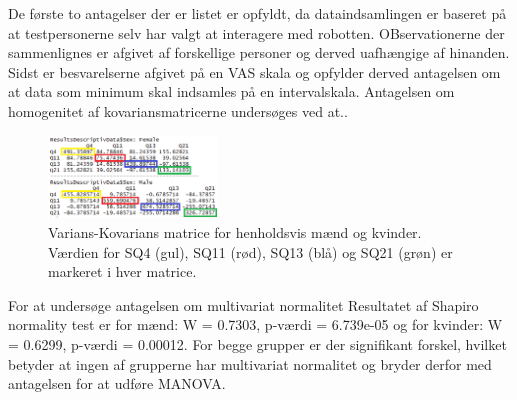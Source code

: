 De første to antagelser der er listet er opfyldt, da dataindsamlingen er baseret på at testpersonerne selv har valgt at interagere med robotten. OBservationerne der sammenlignes er afgivet af forskellige personer og derved uafhængige af hinanden. Sidst er besvarelserne afgivet på en VAS skala og opfylder derved antagelsen om at data som minimum skal indsamles på en intervalskala. \blankline
% 
Antagelsen om homogenitet af kovariansmatricerne undersøges ved at..
%
\begin{figure}[H]
\centering
\includegraphics[width = 0.4\textwidth]{Figure/DatabehandlingSkalaer/Normality} 
\caption{Varians-Kovarians matrice for henholdsvis mænd og kvinder. Værdien for SQ4 (gul), SQ11 (rød), SQ13 (blå) og SQ21 (grøn) er markeret i hver matrice.}
\label{fig:Normality}
\end{figure}
\noindent
%
For at undersøge antagelsen om multivariat normalitet \blankline
%
Resultatet af Shapiro normality test er for mænd: W = 0.7303, p-værdi = 6.739e-05 og for kvinder: W = 0.6299, p-værdi = 0.00012. For begge grupper er der signifikant forskel, hvilket betyder at ingen af grupperne har multivariat normalitet og bryder derfor med antagelsen for at udføre MANOVA. 